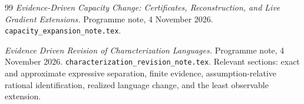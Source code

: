 \documentclass[11pt]{article}
\begin{document}
\begin{thebibliography}{99}
\emph{Evidence-Driven Capacity Change: Certificates, Reconstruction, and Live Gradient Extensions.}
Programme note, 4 November 2026.
\texttt{capacity\_expansion\_note.tex}.

\emph{Evidence Driven Revision of Characterization Languages.}
Programme note, 4 November 2026.
\texttt{characterization\_revision\_note.tex}.
Relevant sections: exact and approximate expressive separation, finite evidence, assumption-relative rational identification, realized language change, and the least observable extension.

\end{thebibliography}
\end{document}
